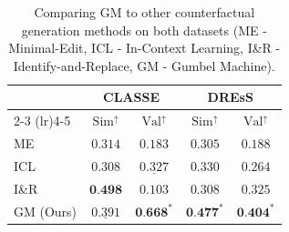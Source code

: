 \documentclass[11pt]{article}
\newcommand{\mh}[1]{\textcolor{teal}{\bf [Hunter: #1]}}
\newcommand{\al}[1]{\textcolor{blue}{\bf [Alex: #1]}}
\begin{document}




\begin{table}[t]
\centering
\setlength{\tabcolsep}{3pt}
\begin{tabular}{l  cc  cc}
\toprule
& \multicolumn{2}{c}{\textbf{CLASSE}} & \multicolumn{2}{c}{\textbf{DREsS}} \\
\cmidrule(lr){2-3} \cmidrule(lr){4-5}
\multirow{-2}{*}{\textbf{Approach}} & $\text{Sim}^\uparrow$ & $\text{Val}^\uparrow$ & $\text{Sim}^\uparrow$ & $\text{Val}^\uparrow$ \\
\midrule
ME %
    & $0.314$ & $0.183$
    & $0.305$ & $0.188$ \\
ICL
    & $0.308$ & $\underline{0.327}$
    & $0.330$ & $0.264$ \\
I\&R %
    & $\textbf{0.498}$ & $0.103$
    & $0.308$ & $0.325$ \\
GM (Ours)
    & $\underline{0.391}$ & $\textbf{0.668}^{*}$
    & $\textbf{0.477}^{*}$ & $\textbf{0.404}^{*}$ \\
\bottomrule
\end{tabular}
\caption{Comparing GM to other counterfactual generation methods on both datasets (ME - Minimal-Edit, ICL - In-Context Learning, I\&R - Identify-and-Replace, GM - Gumbel Machine).}
\label{tab:llama_results}
\vspace{-.3cm}
\end{table}
\end{document}
